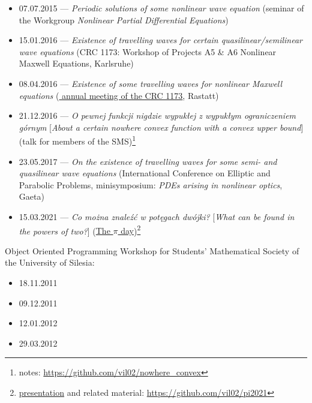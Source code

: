 \begin{itemize}
  \item 07.07.2015 --- \textsl{Periodic solutions of some nonlinear wave equation} (seminar of the Workgroup \textit{Nonlinear Partial Differential Equations})
  \item 15.01.2016 --- \textsl{Existence of travelling waves for certain quasilinear/semilinear wave equations} (CRC 1173: Workshop of Projects A5 \& A6 Nonlinear Maxwell Equations, Karlsruhe)
  \item 08.04.2016 --- \textsl{Existence of some travelling waves for nonlinear Maxwell equations} (\href{\urlFirstAnnualCrc}{ annual meeting of the CRC 1173}, Rastatt)
  \item 21.12.2016 --- \textsl{O pewnej funkcji nigdzie wypukłej z wypukłym ograniczeniem górnym} [\textsl{About a certain nowhere convex function with a convex upper bound}] (talk for members of the SMS)\footnote{notes: \url{https://github.com/vil02/nowhere_convex}}
  \item 23.05.2017 --- \textsl{On the existence of travelling waves for some semi- and quasilinear wave equations} (International Conference on Elliptic and Parabolic Problems, minisymposium: \textit{PDEs arising in nonlinear optics}, Gaeta)
  \item 15.03.2021 --- \textsl{Co można znaleźć w potęgach dwójki?} [\textsl{What can be found in the powers of two?}] (\href{\urlPiXV}{The $\pi$ day})\footnote{\href{https://raw.githubusercontent.com/vil02/pi2021/master/generated/pi2021.pdf}{presentation} and related material: \url{https://github.com/vil02/pi2021}}
\end{itemize}
\noindent Object Oriented Programming Workshop for Students' Mathematical Society of the University of Silesia:
\begin{itemize}
  \item 18.11.2011
  \item 09.12.2011
  \item 12.01.2012
  \item 29.03.2012
\end{itemize}
